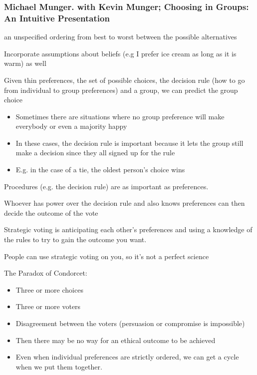 \documentclass[11pt]{article}
\begin{document}
\subsubsection{Michael Munger. with Kevin Munger; Choosing in Groups: An Intuitive Presentation}
\label{sec:org66d1a46}
\begin{description}
\item[{Thin preference}] an unspecified ordering from best to worst between the
possible alternatives
\item[{Thick preferences}] Incorporate assumptions about beliefs (e.g I prefer ice
cream as long as it is warm) as well
\item Given thin preferences, the set of possible choices, the decision rule (how to
go from individual to group preferences) and a group, we can predict the group
choice
\begin{itemize}
\item Sometimes there are situations where no group preference will make everybody
or even a majority happy
\item In these cases, the decision rule is important because it lets the group
still make a decision since they all signed up for the rule
\item E.g. in the case of a tie, the oldest person's choice wins
\end{itemize}
\item Procedures (e.g. the decision rule) are as important as preferences.
\item Whoever has power over the decision rule and also knows preferences can then
decide the outcome of the vote
\item Strategic voting is anticipating each other's preferences and using a
knowledge of the rules to try to gain the outcome you want.
\item People can use strategic voting on you, so it's not a perfect science
\item The Paradox of Condorcet:
\begin{itemize}
\item Three or more choices
\item Three or more voters
\item Disagreement between the voters (persuasion or compromise is impossible)
\item Then there may be no way for an ethical outcome to be achieved
\item Even when individual preferences are strictly ordered, we can get a cycle
when we put them together.
\end{itemize}

\end{description}
\end{document}
